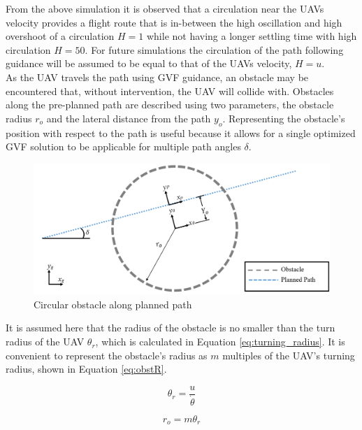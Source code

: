 \documentclass[numbered,pdftex]{ohio-etd}
\begin{document}
From the above simulation it is observed that a circulation near the UAVs velocity provides a flight route that is in-between the high oscillation and high overshoot of a circulation $H=1$ while not having a longer settling time with high circulation $H=50$. For future simulations the circulation of the path following guidance will be assumed to be equal to that of the UAVs velocity, $H=u$. \\

As the UAV travels the path using GVF guidance, an obstacle may be encountered that, without intervention, the UAV will collide with. Obstacles along the pre-planned path are described using two parameters, the obstacle radius $r_o$ and the lateral distance from the path $y_o$. Representing the obstacle's position with respect to the path is useful because it allows for a single optimized GVF solution to be applicable for multiple path angles $\delta$.

\begin{figure}[H]
	\centering
	\includegraphics[width=14cm]{Figures/methods/obstacleOnPath}
	\caption{Circular obstacle along planned path}
	\label{fig:obstacleonpath}
\end{figure}

 It is assumed here that the radius of the obstacle is no smaller than the turn radius of the UAV $\theta_r$, which is calculated in Equation \ref{eq:turning_radius}. It is convenient to represent the obstacle's radius as $m$ multiples of the UAV's turning radius, shown in  Equation \ref{eq:obstR}.
 


\begin{equation}
\label{eq:turning_radius}
\theta_r = \frac{u}{\dot{\theta}}
\end{equation}

\begin{equation}
\label{eq:obstR}
r_o = m \theta_r
\end{equation}
\end{document}
